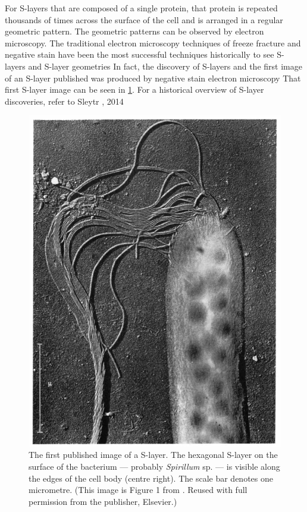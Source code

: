 For \acp{S-layer} that are composed of a single protein, that protein is repeated thousands of times
across the surface of the cell and is arranged in a regular geometric pattern. The geometric
patterns can be observed by electron microscopy. The traditional electron microscopy techniques of freeze fracture and negative stain have been the most successful techniques historically to see \acp{S-layer} and \ac{S-layer} geometries In fact, the discovery of \acp{S-layer} and the first image of an \ac{S-layer} published was produced by negative stain electron microscopy That first \ac{S-layer} image can be seen in \cref{fig:firstslayer}. For a historical overview of \ac{S-layer} discoveries, refer to Sleytr \etal, 2014

\begin{figure}[p] %
  \begin{center}
    \includegraphics{intro/img/firstslayer.pdf}
  \end{center}
  \caption[The first published image of a \ac{S-layer}]{The first published image of a
    \ac{S-layer}. The hexagonal \ac{S-layer} on the surface of the bacterium --- probably
    \textit{Spirillum} sp. --- is visible along the edges of the cell body (centre right). The scale
    bar denotes one micrometre. (This image is Figure 1 from . Reused with
    full permission from the publisher, Elsevier.)}
  \label{fig:firstslayer}
\end{figure} 

